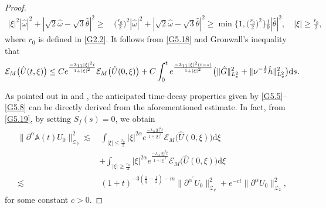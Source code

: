 \documentclass[reqno,11pt]{amsart}
\theoremstyle{plain}
\numberwithin{equation}{section}
\begin{document}
\begin{proof}
\begin{align*}
|\xi|^2|\hat{\omega}|^2 +  |\sqrt{2}\hat{\omega} - \sqrt{3}\hat{\theta}|^2   \geq&\, \Big(\frac{r_0}{2}\Big)^2|\hat{\omega}|^2 +  |\sqrt{2}\hat{\omega} - \sqrt{3}\hat{\theta}|^2  \geq \min\Big\{1,\Big(\frac{r_0}{2}\Big)^2\Big\}\frac{1}{9}|\hat{\theta}|^2,   \quad |\xi| \geq \frac{r_0}{2}, 
\end{align*} 
where $r_0$ is defined in \eqref{G2.2}.
It follows from \eqref{G5.18} and Gronwall's inequality that
\begin{align}\label{G5.19}
\mathcal{E}_{M}\big(\hat{U}(t,\xi)\big)\leq Ce^{\frac{-\lambda_{11}|\xi|^{2}t}{1+|\xi|^{2}}}
\mathcal{E}_{M}\big(\hat{U}(0,\xi)\big)+C\int_{0}^{t}e^{\frac{-\lambda_{11}|\xi|^{2}(t-s)}{1+|\xi|^{2}}}
\big(\|\hat{G}\|_{L_{v}^{2}}^{2}+\|\nu^{-\frac{1}{2}}\hat{h}\|_{L_{v}^{2}}^{2}\big){\rm d}s.
\end{align}

As pointed out  in \cite{SK-HMJ-1985} and \cite[Theorem 3.1]{DFT-2010-CMP}, the anticipated time-decay properties given by \eqref{G5.5}--\eqref{G5.8} can be directly derived from the aforementioned estimate. 
%
In fact, from \eqref{G5.19}, by setting $ {S}_f(s) = 0 $, we obtain   
\begin{align}\label{G5.20}
\|\partial^{\alpha}\mathbb{A}(t)U_{0}\|_{\mathcal{Z}_{2}}^2\lesssim & \, \int_{|\xi|\leq \frac{r_0}{2}} |\xi|^{2\alpha}e^{\frac{-\lambda_{11}|\xi|^{2}t}{1+|\xi|^{2}}}
\mathcal{E}_{M}\big(\hat{U}(0,\xi)\big)\mathrm{d}\xi\nonumber\\
& +\int_{|\xi|\geq \frac{r_0}{2}} |\xi|^{2\alpha}e^{\frac{-\lambda_{11}|\xi|^{2}t}{1+|\xi|^{2}}}
\mathcal{E}_{M}\big(\hat{U}(0,\xi)\big)\mathrm{d}\xi\nonumber\\
\lesssim&\,   (1+t )^{-3 (\frac{1}{q}-\frac{1}{2} )-m}
\|\partial^{\alpha^{\prime}}U_{0}\|_{\mathcal{Z}_{q}}^2+ e^{-ct}\|\partial^{\alpha}U_{0}\|_{\mathcal{Z}_{2}}^2,
\end{align}
for some constant $c>0$.


\end{proof}
\end{document}
